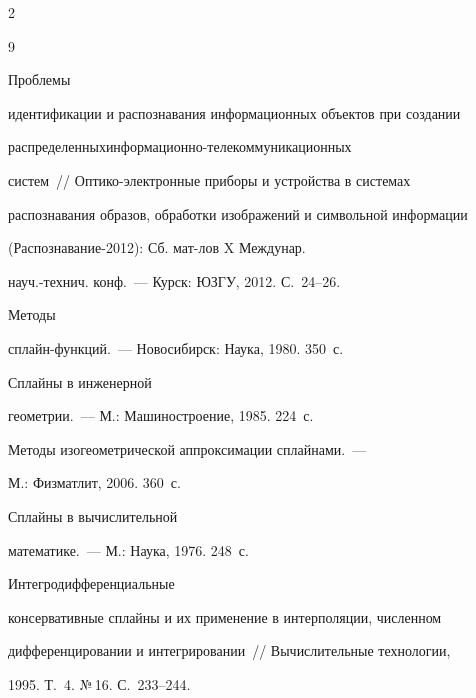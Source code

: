 \begin{multicols}{2}
{\small\frenchspacing


{%




\begin{thebibliography}{9}




 Проб\-ле\-мы 


идентификации и распознавания инфор\-мационных объектов при создании 


распределенных\linebreak ин\-фор\-ма\-ци\-он\-но-те\-ле\-ком\-му\-ни\-ка\-ци\-он\-ных 


сис\-тем~// Оп\-ти\-ко-элект\-рон\-ные приборы и устройства в сис\-те\-мах 


распознавания образов, обработки изображений и символьной информации 


(Распознавание-2012): Сб. мат-лов X Междунар. 


на\-уч.-технич. конф.~--- Курск: ЮЗГУ, 2012. С.~24--26. 




 Методы 


сплайн-функ\-ций.~--- Новосибирск: Наука, 1980. 350~с.




 Сплайны в инженерной 


геометрии.~--- М.: Машиностроение, 1985. 224~с.




 Методы изогеометрической аппроксимации сплайнами.~--- 


М.: Физматлит, 2006. 360~с.




 Сплайны в вычислительной 


математике.~--- М.: Наука, 1976. 248~с.




 Интегродифференциальные 


консервативные сплайны и их применение в интерполяции, чис\-лен\-ном 


дифференцировании и интегрировании~// Вычислительные технологии, 


1995. Т.~4. №\,16. С.~233--244. 



\end{thebibliography}}}
\end{multicols}
